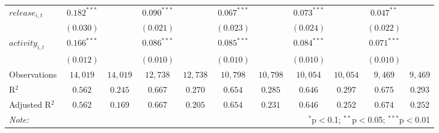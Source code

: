 \begin{table}
\begin{center}
\begin{tabular}{lcccccccccc}
\addlinespace
$release_{i,t}$         & $0.182^{***}$  &               & $0.090^{***}$  &                & $0.067^{***}$  &                & $0.073^{***}$  &                & $0.047^{**}$   &                \\
                         & $(0.030)$      &               & $(0.021)$      &                & $(0.023)$      &                & $(0.024)$      &                & $(0.022)$      &                \\
\addlinespace
$activity_{i,t}$        & $0.166^{***}$  &               & $0.086^{***}$  &                & $0.085^{***}$  &                & $0.084^{***}$  &                & $0.071^{***}$  &                \\
                         & $(0.012)$      &               & $(0.010)$      &                & $(0.010)$      &                & $(0.010)$      &                & $(0.010)$      &                \\
\midrule
Observations               & $14,019$       & $14,019$      & $12,738$       & $12,738$       & $10,798$       & $10,798$       & $10,054$       & $10,054$       & $9,469$        & $9,469$        \\
R$^2$                    & $0.562$        & $0.245$       & $0.667$        & $0.270$        & $0.654$        & $0.285$        & $0.646$        & $0.297$        & $0.675$        & $0.293$        \\
Adjusted R$^2$              & $0.562$        & $0.169$       & $0.667$        & $0.205$        & $0.654$        & $0.231$        & $0.646$        & $0.252$        & $0.674$        & $0.252$        \\

\bottomrule
\textit{Note:}  & \multicolumn{10}{r}{$^{*}$p$<$0.1; $^{**}$p$<$0.05; $^{***}$p$<$0.01} \\ 
\end{tabular}

\label{tab:all-regressions}
\end{center}
\end{table}

